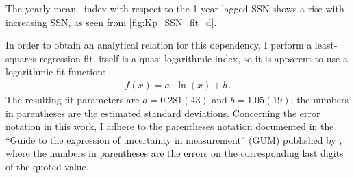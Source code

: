 The yearly mean \Kp~index with respect to the 1-year lagged SSN shows a rise with increasing SSN, as seen from \autoref{fig:Kp_SSN_fit_d}.
\begin{figure}
\end{figure}
In order to obtain an analytical relation for this dependency, I perform a least-squares regression fit. \Kp{} itself is a quasi-logarithmic index, so it is apparent to use a logarithmic fit function:
\begin{align}
	f(x) = a \cdot \ln(x) + b	\,.	\label{eq:log_fit_function}
\end{align}
The resulting fit parameters are $a = 0.281(43)$ and $b = 1.05(19)$; the numbers in parentheses are the estimated standard deviations. Concerning the error notation in this work, I adhere to the parentheses notation documented in the ``Guide to the expression of uncertainty in measurement'' (GUM) published by \citet{GUM2008}, where the numbers in parentheses are the errors on the corresponding last digits of the quoted value.

